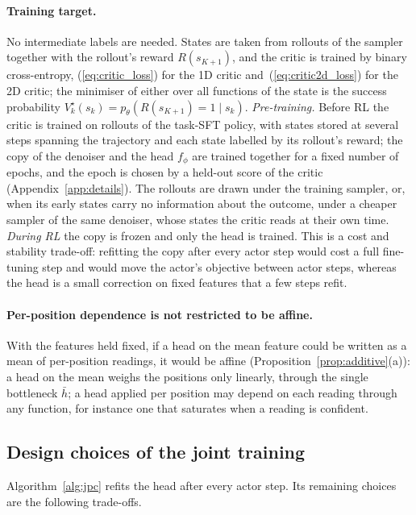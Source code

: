 \paragraph{Training target.}
No intermediate labels are needed. States are taken from rollouts of the sampler together with the rollout's reward $R(s_{K+1})$, and the critic is trained by binary cross-entropy, (\ref{eq:critic_loss}) for the 1D critic and~(\ref{eq:critic2d_loss}) for the 2D critic; the minimiser of either over all functions of the state is the success probability $V^\star_k(s_k)=p_\theta(R(s_{K+1})=1\mid s_k)$. \emph{Pre-training.} Before RL the critic is trained on rollouts of the task-SFT policy, with states stored at several steps spanning the trajectory and each state labelled by its rollout's reward; the copy of the denoiser and the head $f_\phi$ are trained together for a fixed number of epochs, and the epoch is chosen by a held-out score of the critic (Appendix~\ref{app:details}). The rollouts are drawn under the training sampler, or, when its early states carry no information about the outcome, under a cheaper sampler of the same denoiser, whose states the critic reads at their own time. \emph{During RL} the copy is frozen and only the head is trained. This is a cost and stability trade-off: refitting the copy after every actor step would cost a full fine-tuning step and would move the actor's objective between actor steps, whereas the head is a small correction on fixed features that a few steps refit.

\paragraph{Per-position dependence is not restricted to be affine.} With the features held fixed, if a head on the mean feature could be written as a mean of per-position readings, it would be affine (Proposition~\ref{prop:additive}(a)): a head on the mean weighs the positions only linearly, through the single bottleneck $\bar h$; a head applied per position may depend on each reading through any function, for instance one that saturates when a reading is confident.

\subsection{Design choices of the joint training}
\label{app:joint_details}
Algorithm~\ref{alg:jpc} refits the head after every actor step. Its remaining choices are the following trade-offs.


